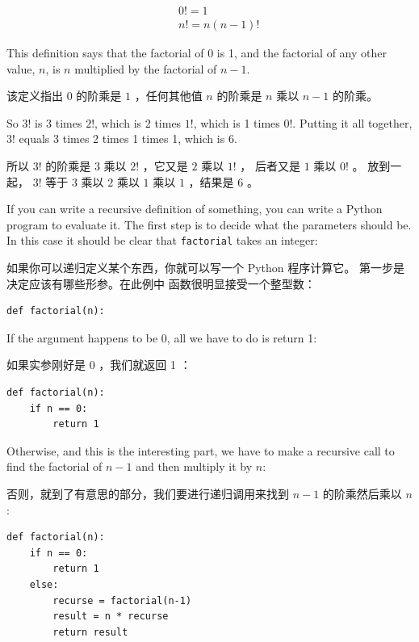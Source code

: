 %
\begin{eqnarray*}
&&  0! = 1 \\
&&  n! = n (n-1)!
\end{eqnarray*}

%
This definition says that the factorial of 0 is 1, and the factorial
of any other value, $n$, is $n$ multiplied by the factorial of $n-1$.

该定义指出 $0$ 的阶乘是 $1$ ，任何其他值 $n$ 的阶乘是 $n$ 乘以 $n-1$ 的阶乘。

So $3!$ is 3 times $2!$, which is 2 times $1!$, which is 1 times
$0!$. Putting it all together, $3!$ equals 3 times 2 times 1 times 1,
which is 6.

所以 $3!$ 的阶乘是 $3$ 乘以 $2!$ ，它又是 $2$ 乘以 $1!$ ， 后者又是 $1$ 乘以 $0!$ 。 放到一起， $3!$ 等于 $3$ 乘以 $2$ 乘以 $1$ 乘以 $1$ ，结果是 $6$ 。
  

If you can write a recursive definition of something, you can
write a Python program to evaluate it. The first step is to decide
what the parameters should be.  In this case it should be clear
that {\tt factorial} takes an integer:

如果你可以递归定义某个东西，你就可以写一个 Python 程序计算它。
第一步是决定应该有哪些形参。在此例中  函数很明显接受一个整型数：


\begin{lstlisting}
def factorial(n):
\end{lstlisting}

%
If the argument happens to be 0, all we have to do is return 1:

如果实参刚好是 0 ，我们就返回 1 ：


\begin{lstlisting}
def factorial(n):
    if n == 0:
        return 1
\end{lstlisting}

%
Otherwise, and this is the interesting part, we have to make a
recursive call to find the factorial of $n-1$ and then multiply it by
$n$:

否则，就到了有意思的部分，我们要进行递归调用来找到 $n-1$ 的阶乘然后乘以 $n$:

\begin{lstlisting}
def factorial(n):
    if n == 0:
        return 1
    else:
        recurse = factorial(n-1)
        result = n * recurse
        return result
\end{lstlisting}

